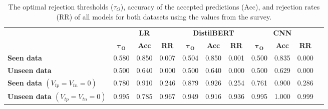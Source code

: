\begin{table}
    \scriptsize
    \centering
    \begin{tabular}{lcccccccccc}
        \toprule
                                                 & \multicolumn{3}{c}{\textbf{LR}} & \multicolumn{3}{c}{\textbf{DistilBERT}} & \multicolumn{3}{c}{\textbf{CNN}}                                                                                                           \\
        \cmidrule(l){2-4} \cmidrule(l){5-7} \cmidrule(l){8-10}
                                                 & $\boldsymbol{\tau_O}$           & \textbf{Acc}                            & \textbf{RR}                      & $\boldsymbol{\tau_O}$ & \textbf{Acc} & \textbf{RR} & $\boldsymbol{\tau_O}$ & \textbf{Acc} & \textbf{RR} \\
        \midrule
        \textbf{Seen data}                       & 0.580                           & 0.850                                   & 0.007                            & 0.504                 & 0.850        & 0.001       & 0.500                 & 0.835        & 0.000       \\
        \textbf{Unseen data}                     & 0.500                           & 0.640                                   & 0.000                            & 0.500                 & 0.640        & 0.000       & 0.500                 & 0.629        & 0.000       \\
        \midrule
        \textbf{Seen data $(V_{tp}=V_{tn}=0)$}   & 0.780                           & 0.910                                   & 0.246                            & 0.879                 & 0.926        & 0.254       & 0.761                 & 0.900        & 0.286       \\
        \textbf{Unseen data $(V_{tp}=V_{tn}=0)$} & 0.995                           & 0.785                                   & 0.967                            & 0.949                 & 0.916        & 0.936       & 0.995                 & 1.000        & 0.999       \\
        \bottomrule
    \end{tabular}
    \caption{The optimal rejection thresholds ($\tau_O$), accuracy of the accepted predictions (Acc), and rejection rates (RR) of all models for both datasets using the values from the survey.}
    \label{tab:metric}
\end{table}

